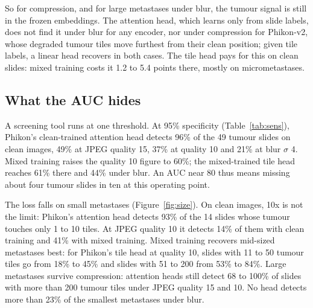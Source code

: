 \documentclass[11pt,a4paper]{article}
\begin{document}
So for compression, and for large metastases under blur, the tumour signal is still in the frozen embeddings. The attention head, which learns only from slide labels, does not find it under blur for any encoder, nor under compression for Phikon-v2, whose degraded tumour tiles move furthest from their clean position; given tile labels, a linear head recovers in both cases. The tile head pays for this on clean slides: mixed training costs it 1.2 to 5.4 points there, mostly on micrometastases.

\begin{table}[h]\centering\small
\caption{Encoder or head, at JPEG Q10 and blur $\sigma$ 4. Cosine: mean over tumour tiles of test tumour slides. Tile probe: tile AUC in \%. Top-attended tile: \% of the 49 test tumour slides whose most-attended tile touches tumour, mean of five seeds; the change from mixed training is averaged per slide with a 95\% bootstrap interval over slides (bold: excludes zero). Slide AUC in \%.}
\label{tab:enchead}
\setlength{\tabcolsep}{4pt}
\resizebox{\linewidth}{!}{}
\end{table}

\subsection{What the AUC hides}
\label{sec:size}

A screening tool runs at one threshold. At 95\% specificity (Table~\ref{tab:sens}), Phikon's clean-trained attention head detects 96\% of the 49 tumour slides on clean images, 49\% at JPEG quality 15, 37\% at quality 10 and 21\% at blur $\sigma$ 4. Mixed training raises the quality 10 figure to 60\%; the mixed-trained tile head reaches 61\% there and 44\% under blur. An AUC near 80 thus means missing about four tumour slides in ten at this operating point.

The loss falls on small metastases (Figure~\ref{fig:size}). On clean images, 10x is not the limit: Phikon's attention head detects 93\% of the 14 slides whose tumour touches only 1 to 10 tiles. At JPEG quality 10 it detects 14\% of them with clean training and 41\% with mixed training. Mixed training recovers mid-sized metastases best: for Phikon's tile head at quality 10, slides with 11 to 50 tumour tiles go from 18\% to 45\% and slides with 51 to 200 from 53\% to 84\%. Large metastases survive compression: attention heads still detect 68 to 100\% of slides with more than 200 tumour tiles under JPEG quality 15 and 10. No head detects more than 23\% of the smallest metastases under blur.
\end{document}
